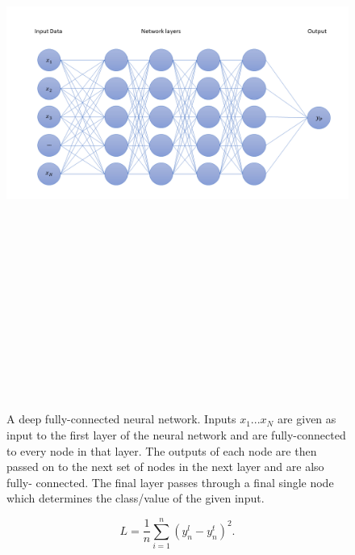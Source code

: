 \begin{figure}
    \centering
    \includegraphics[width=17cm,height=20cm,keepaspectratio]{figures/DeepFullyConnectedNetwork.png}
    \caption[Deep fully-connected neural network illustration.]{A deep fully-connected neural network. Inputs $x_1 ... x_N$ are given as input to the 
    first layer of the neural network and are fully-connected to every node in that layer. The outputs 
    of each node are then passed on to the next set of nodes in the next layer and are also fully-
    connected. The final layer passes through a final single node which determines the class/value 
    of the given input.}
    \label{fig:deep_nn}
\end{figure}

\begin{equation}
    L = \frac{1}{n} \sum_{i=1}^{n}(y^{l}_n-y^{t}_n)^2.
\end{equation}{}

